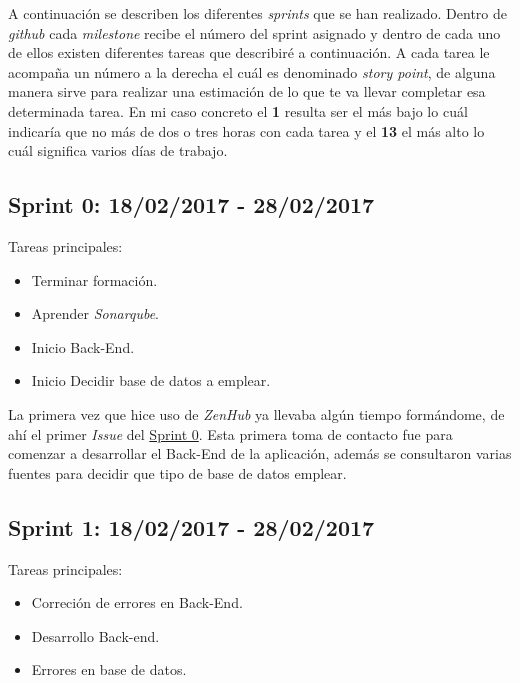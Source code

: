 A continuación se describen los diferentes \emph{sprints} que se han
realizado. Dentro de \emph{github} cada \emph{milestone} recibe el número del sprint asignado y dentro de cada uno de ellos existen diferentes tareas que describiré a continuación. A cada tarea le acompaña un número a la derecha el cuál es denominado \emph{story point}, de alguna manera sirve para realizar una estimación de lo que te va llevar completar esa determinada tarea. En mi caso concreto el \textbf{1} resulta ser el más bajo lo cuál indicaría que no más de dos o tres horas con cada tarea y el  \textbf{13} el más alto lo cuál significa varios días de trabajo.


\subsection{Sprint 0: 18/02/2017 - 28/02/2017}\label{sprint0}

Tareas principales:

\begin{itemize}
	\item Terminar formación.
	\item Aprender \emph{Sonarqube}.
	\item Inicio Back-End.
    \item Inicio Decidir base de datos a emplear.
\end{itemize}


La primera vez que hice uso de \emph{ZenHub} ya llevaba algún tiempo formándome, de ahí el primer \emph{Issue} del \underline{Sprint 0}. Esta primera toma de contacto fue para comenzar a desarrollar el Back-End de la aplicación, además se consultaron varias fuentes para decidir que tipo de base de datos emplear.

\subsection{Sprint 1: 18/02/2017 - 28/02/2017}\label{sprint1}

Tareas principales:

\begin{itemize}
	\item Correción de errores en Back-End.
	\item Desarrollo Back-end.
	\item Errores en base de datos.
\end{itemize}


